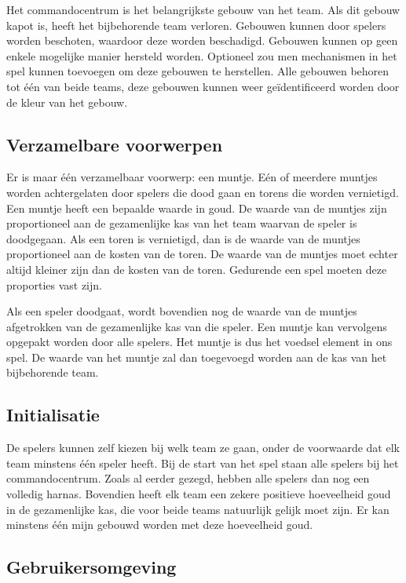     Het commandocentrum is het belangrijkste gebouw van het team. Als dit gebouw kapot is, heeft het bijbehorende team verloren. Gebouwen kunnen door spelers worden beschoten, waardoor deze worden beschadigd. Gebouwen kunnen op geen enkele mogelijke manier hersteld worden. Optioneel zou men mechanismen in het spel kunnen toevoegen om deze gebouwen te herstellen. Alle gebouwen behoren tot \'e\'en van beide teams, deze gebouwen kunnen weer ge\"identificeerd worden door de kleur van het gebouw.

    \subsection{Verzamelbare voorwerpen}
    Er is maar \'e\'en verzamelbaar voorwerp: een muntje. E\'en of meerdere muntjes worden achtergelaten door spelers die dood gaan en torens die worden vernietigd. Een muntje heeft een bepaalde waarde in goud. De waarde van de muntjes zijn proportioneel aan de gezamenlijke kas van het team waarvan de speler is doodgegaan. Als een toren is vernietigd, dan is de waarde van de muntjes proportioneel aan de kosten van de toren. De waarde van de muntjes moet echter altijd kleiner zijn dan de kosten van de toren. Gedurende een spel moeten deze proporties vast zijn.

    Als een speler doodgaat, wordt bovendien nog de waarde van de muntjes afgetrokken van de gezamenlijke kas van die speler. Een muntje kan vervolgens opgepakt worden door alle spelers. Het muntje is dus het voedsel element in ons spel. De waarde van het muntje zal dan toegevoegd worden aan de kas van het bijbehorende team.

    \subsection{Initialisatie}
    De spelers kunnen zelf kiezen bij welk team ze gaan, onder de voorwaarde dat elk team minstens \'e\'en speler heeft. Bij de start van het spel staan alle spelers bij het commandocentrum. Zoals al eerder gezegd, hebben alle spelers dan nog een volledig harnas. Bovendien heeft elk team een zekere positieve hoeveelheid goud in de gezamenlijke kas, die voor beide teams natuurlijk gelijk moet zijn. Er kan minstens \'e\'en mijn gebouwd worden met deze hoeveelheid goud.
    \FloatBarrier

    \subsection{Gebruikersomgeving}
    \label{sec:UI}

